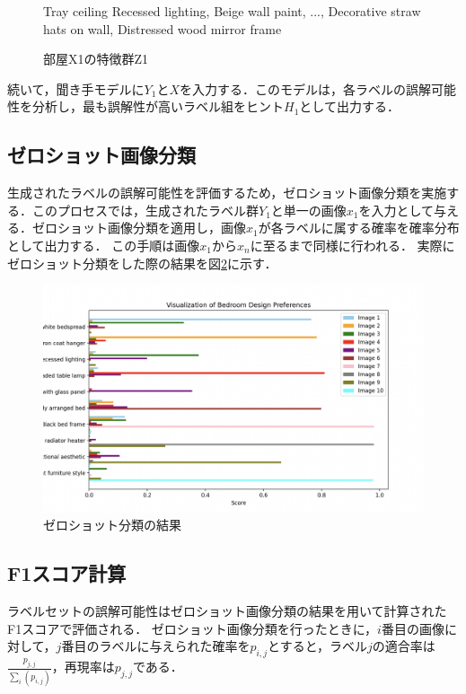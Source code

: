 \documentclass[a4paper,11pt]{jreport}
\begin{document}
\begin{figure}[H]
\begin{mdframed}[linewidth=1pt]
Tray ceiling Recessed lighting, Beige wall paint, ..., Decorative straw hats on wall, Distressed wood mirror frame
\end{mdframed}
\caption{部屋X1の特徴群Z1}
\label{fig:feature_group}
\end{figure}

続いて，聞き手モデルに$Y_1$と$X$を入力する．このモデルは，各ラベルの誤解可能性を分析し，最も誤解性が高いラベル組をヒント$H_1$として出力する．
\subsection{ゼロショット画像分類}
生成されたラベルの誤解可能性を評価するため，ゼロショット画像分類を実施する．このプロセスでは，生成されたラベル群$Y_1$と単一の画像$x_1$を入力として与える．ゼロショット画像分類を適用し，画像$x_1$が各ラベルに属する確率を確率分布として出力する．
この手順は画像$x_1$から$x_n$に至るまで同様に行われる．
実際にゼロショット分類をした際の結果を図\ref{fig:zeroshot_result}に示す．
\begin{figure}[H]
  \centering
  \includegraphics[width=\linewidth]{figures/zeroshot_result.png}
  \caption{ゼロショット分類の結果}
  \label{fig:zeroshot_result}
\end{figure}
\subsection{F1スコア計算}
ラベルセットの誤解可能性はゼロショット画像分類の結果を用いて計算されたF1スコアで評価される．
ゼロショット画像分類を行ったときに，$i$番目の画像に対して，$j$番目のラベルに与えられた確率を$p_{i,j}$とすると，ラベル$j$の適合率は$\frac{p_{j,j}}{\sum_i(p_{i,j})}$，再現率は$p_{j,j}$である．
\end{document}
